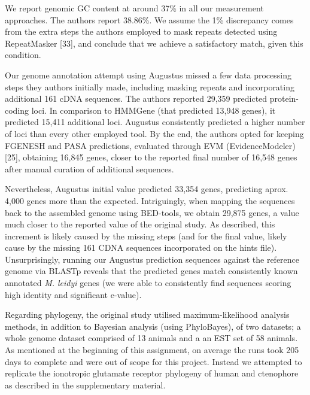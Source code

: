 \documentclass[
]{article}
\begin{document}
We report genomic GC content at around 37\% in all our measurement
approaches. The authors report 38.86\%. We assume the 1\% discrepancy
comes from the extra steps the authors employed to mask repeats detected
using RepeatMasker {[}33{]}, and conclude that we achieve a satisfactory
match, given this condition.

Our genome annotation attempt using Augustus missed a few data
processing steps they authors initially made, including masking repeats
and incorporating additional 161 cDNA sequences. The authors reported
29,359 predicted protein-coding loci. In comparison to HMMGene (that
predicted 13,948 genes), it predicted 15,411 additional loci. Augustus
consistently predicted a higher number of loci than every other employed
tool. By the end, the authors opted for keeping FGENESH and PASA
predictions, evaluated through EVM (EvidenceModeler) {[}25{]}, obtaining
16,845 genes, closer to the reported final number of 16,548 genes after
manual curation of additional sequences.

Nevertheless, Augustus initial value predicted 33,354 genes, predicting
aprox. 4,000 genes more than the expected. Intriguingly, when mapping
the sequences back to the assembled genome using BED-tools, we obtain
29,875 genes, a value much closer to the reported value of the original
study. As described, this increment is likely caused by the missing
steps (and for the final value, likely cause by the missing 161 CDNA
sequences incorporated on the hints file). Unsurprisingly, running our
Augustus prediction sequences against the reference genome via BLASTp
reveals that the predicted genes match consistently known annotated
\emph{M. leidyi} genes (we were able to consistently find sequences
scoring high identity and significant e-value).

Regarding phylogeny, the original study utilised maximum-likelihood
analysis methods, in addition to Bayesian analysis (using PhyloBayes),
of two datasets; a whole genome dataset comprised of 13 animals and a an
EST set of 58 animals. As mentioned at the beginning of this assignment,
on average the runs took 205 days to complete and were out of scope for
this project. Instead we attempted to replicate the ionotropic glutamate
receptor phylogeny of human and ctenophore as described in the
supplementary material.
\end{document}
